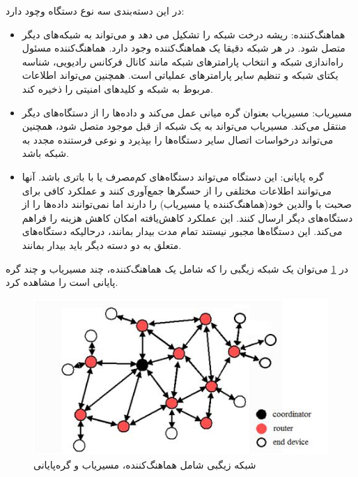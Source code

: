 در این دسته‌بندی سه نوع دستگاه وچود دارد:
\begin{itemize}
\item هماهنگ‌کننده: ریشه درخت شبکه را تشکیل می دهد و می‌تواند به شبکه‌های دیگر متصل شود. در هر شبکه دقیقا یک هماهنگ‌کننده وجود دارد. هماهنگ‌کننده مسئول راه‌اندازی شبکه و انتخاب پارامترهای شبکه مانند کانال فرکانس رادیویی، شناسه یکتای شبکه و تنظیم سایر پارامترهای عملیاتی است. همچنین می‌تواند اطلاعات مربوط به شبکه و کلیدهای امنیتی را ذخیره کند\cite{ramya2011study}.
\item مسیریاب: مسیریاب بعنوان گره‌ میانی عمل می‌کند و داده‌ها را از دستگاه‌های دیگر منتقل می‌کند. مسیریاب می‌تواند به یک شبکه از قبل موجود متصل شود، همچنین می‌تواند درخواسات اتصال سایر دستگاه‌ها را بپذیرد و نوعی فرستنده مجدد به شبکه باشد\cite{ramya2011study}.
\item گره پایانی: این دستگاه می‌تواند دستگاه‌های کم‌مصرف یا با باتری باشد. آنها می‌توانند اطلاعات مختلفی را از حسگرها جمع‌آوری کنند و عملکرد کافی برای صحبت با والدین خود(هماهنگ‌کننده یا مسیریاب) را دارند اما نمی‌توانند داده‌ها را از دستگاه‌های دیگر ارسال کنند. این عملکرد کاهش‌یافته امکان کاهش هزینه را فراهم می‌کند. این دستگاه‌ها مجبور نیستند تمام مدت بیدار بمانند، درحالیکه دستگاه‌های متعلق به دو دسته دیگر باید بیدار بمانند\cite{ramya2011study}. 
\end{itemize}

در \cref{fig:zigbee_network} \cite{song2019research} می‌توان یک شبکه زیگبی را که شامل یک هماهنگ‌کننده، چند مسیریاب و چند گره پایانی است را مشاهده کرد.

\begin{figure}[!h]
\centering\includegraphics[scale=1]{zigbee_network.png}
\caption{شبکه زیگبی شامل هماهنگ‌کننده، مسیریاب و گره‌پایانی \cite{song2019research}}\label{fig:zigbee_network}
\end{figure}

